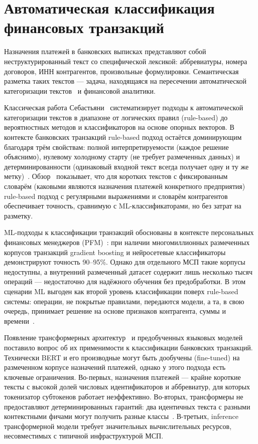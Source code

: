 \section{Автоматическая классификация финансовых транзакций}

Назначения платежей в банковских выписках представляют собой неструктурированный текст со специфической лексикой: аббревиатуры, номера договоров, ИНН контрагентов, произвольные формулировки. Семантическая разметка таких текстов --- задача, находящаяся на пересечении автоматической категоризации текстов~\cite{sebastiani2002machine} и финансовой аналитики.

Классическая работа Себастьяни~\cite{sebastiani2002machine} систематизирует подходы к автоматической категоризации текстов в диапазоне от логических правил (rule-based) до вероятностных методов и классификаторов на основе опорных векторов. В контексте банковских транзакций rule-based подход остаётся доминирующим благодаря трём свойствам: полной интерпретируемости (каждое решение объяснимо), нулевому холодному старту (не требует размеченных данных) и детерминированности (одинаковый входной текст всегда получает одну и ту же метку)~\cite{Cohen1995}. Обзор~\cite{aggarwal2012survey} показывает, что для коротких текстов с фиксированным словарём (каковыми являются назначения платежей конкретного предприятия) rule-based подход с регулярными выражениями и словарём контрагентов обеспечивает точность, сравнимую с ML-классификаторами, но без затрат на разметку.

ML-подходы к классификации транзакций обоснованы в контексте персональных финансовых менеджеров (PFM)~\cite{provost2013data}: при наличии многомиллионных размеченных корпусов транзакций gradient boosting и нейросетевые классификаторы демонстрируют точность 90--95\%. Однако для отдельного МСП такие корпусы недоступны, а внутренний размеченный датасет содержит лишь несколько тысяч операций --- недостаточно для надёжного обучения без предобработки. В этом сценарии ML выгоден как второй уровень классификации поверх rule-based системы: операции, не покрытые правилами, передаются модели, а та, в свою очередь, принимает решение на основе признаков контрагента, суммы и времени~\cite{pustejovsky2012natural}.

Появление трансформерных архитектур~\cite{vaswani2017attention} и предобученных языковых моделей~\cite{devlin2018bert} поставило вопрос об их применимости к классификации банковских транзакций. Технически BERT и его производные могут быть дообучены (fine-tuned) на размеченном корпусе назначений платежей, однако у этого подхода есть ключевые ограничения. Во-первых, назначения платежей --- крайне короткие тексты с высокой долей числовых идентификаторов и аббревиатур, для которых токенизатор субтокенов работает неэффективно. Во-вторых, трансформеры не предоставляют детерминированных гарантий: два идентичных текста с разными контекстными фичами могут получить разные классы~\cite{ji2023survey}. В-третьих, inference трансформерной модели требует значительных вычислительных ресурсов, несовместимых с типичной инфраструктурой МСП.

